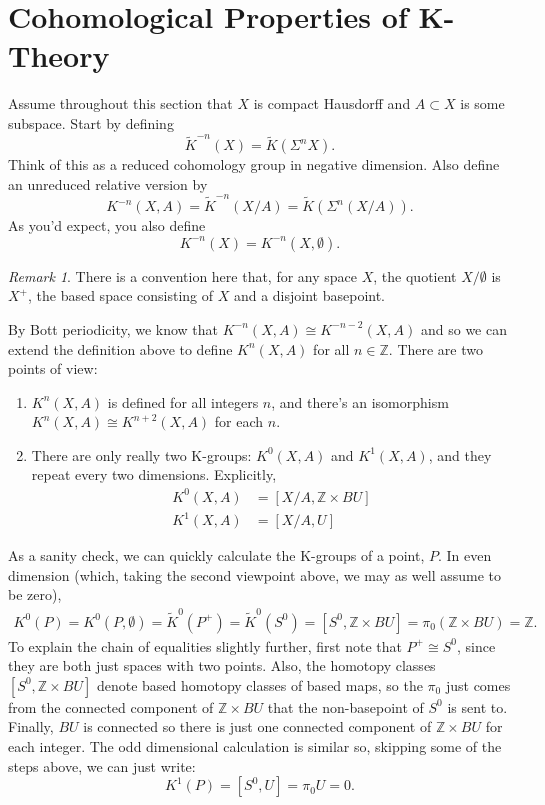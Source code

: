 \documentclass[a4paper,10pt]{article}
\theoremstyle{plain}%
\theoremstyle{definition}
\theoremstyle{remark}
\newtheorem{rem}{Remark}
\newcommand{\ZZ}{\mathbb{Z}}
\begin{document}
\section{Cohomological Properties of K-Theory}

Assume throughout this section that $X$ is compact Hausdorff and $A
\subset X$ is some subspace. Start by defining
\begin{equation*}
  \tilde{K}^{-n}(X) = \tilde{K}(\Sigma^n X).
\end{equation*}
Think of this as a reduced cohomology group in negative
dimension. Also define an unreduced relative version by
\begin{equation*}
  K^{-n}(X, A) = \tilde{K}^{-n}(X/A) = \tilde{K}(\Sigma^n (X/A)).
\end{equation*}
As you'd expect, you also define
\begin{equation*}
  K^{-n}(X) = K^{-n}(X, \emptyset).
\end{equation*}
\begin{rem}
  There is a convention here that, for any space $X$, the quotient
  $X/\emptyset$ is $X^+$, the based space consisting of $X$ and a
  disjoint basepoint.
\end{rem}

By Bott periodicity, we know that $K^{-n}(X,A) \cong K^{-n-2}(X,A)$
and so we can extend the definition above to define $K^n(X,A)$ for all
$n \in \ZZ$. There are two points of view:
\begin{enumerate}
\item $K^n(X,A)$ is defined for all integers $n$, and there's an
  isomorphism $K^{n}(X,A) \cong K^{n+2}(X,A)$ for each $n$.

\item There are only really two K-groups: $K^0(X,A)$ and $K^1(X,A)$,
  and they repeat every two dimensions. Explicitly,
  \begin{align*}
    K^0(X,A) &= [X/A, \ZZ\times BU]\\
    K^1(X,A) &= [X/A, U]
  \end{align*}
\end{enumerate}

As a sanity check, we can quickly calculate the K-groups of a point,
$P$. In even dimension (which, taking the second viewpoint above, we
may as well assume to be zero),
\begin{align*}
  K^0(P) = K^0(P, \emptyset) = \tilde{K}^0(P^+) = \tilde{K}^0(S^0)
  = [S^0, \ZZ\times BU] = \pi_0(\ZZ \times BU) = \ZZ.
\end{align*}
To explain the chain of equalities slightly further, first note that
$P^+ \cong S^0$, since they are both just spaces with two
points. Also, the homotopy classes $[S^0, \ZZ\times BU]$ denote based
homotopy classes of based maps, so the $\pi_0$ just comes from the
connected component of $\ZZ\times BU$ that the non-basepoint of $S^0$
is sent to. Finally, $BU$ is connected so there is just one connected
component of $\ZZ\times BU$ for each integer. The odd dimensional
calculation is similar so, skipping some of the steps above, we can
just write:
\begin{equation*}
  K^1(P) = [S^0, U] = \pi_0U = 0.
\end{equation*}
\end{document}
